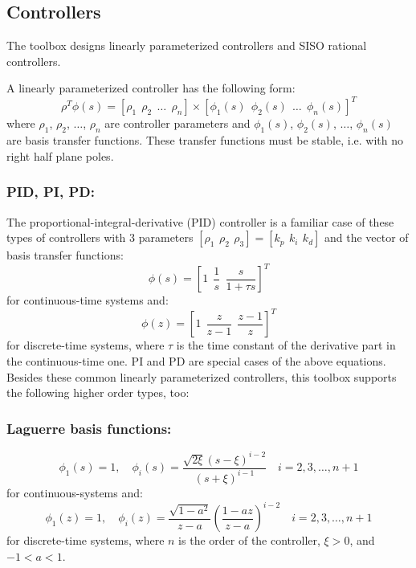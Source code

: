 \documentclass [12pt , a4paper] {report}
\begin{document}
\subsection{Controllers}

The toolbox designs linearly parameterized controllers and SISO rational controllers.

A linearly parameterized controller has the following form:
\begin{equation}
\label{linparcon}
\rho^T \phi(s)=[\rho_1 \: \: \rho_2 \: \: \ldots \:\: \rho_n]\times [\phi_1(s) \: \: \phi_2(s) \:\: \ldots \:\: \phi_n(s)]^T
\end{equation}
where $\rho_1$, $\rho_2$, $\ldots$, $\rho_n$ are controller parameters and $\phi_1(s)$, $\phi_2(s)$, $\ldots$, $\phi_n(s)$ are basis transfer functions. These transfer functions must be stable, i.e. with no right half plane poles. 

\subsubsection{PID, PI, PD:}

The proportional-integral-derivative (PID) controller is a familiar case of these types of controllers with 3 parameters $[\rho_1 \:\, \rho_2 \:\, \rho_3]=[k_p \:\, k_i \:\, k_d]$ and the vector of basis transfer functions:
\begin{equation}
\phi (s)=[1 \:\: \frac{1}{s} \:\: \frac{s}{1+\tau s}]^T
\end{equation}
for continuous-time systems and:
\begin{equation}
\phi (z)=[1 \:\: \frac{z}{z-1} \:\: \frac{z-1}{z}]^T 
\end{equation}
for discrete-time systems, where $\tau$ is the time constant of the derivative part in the continuous-time one. PI and PD are special cases of the above equations. Besides these common linearly parameterized controllers, this toolbox supports the following higher order types, too: 

\subsubsection{Laguerre basis functions:}

\begin{equation}
\phi_1(s)=1, \quad \phi_i(s)=\frac{\sqrt{2\xi}(s-\xi)^{i-2}}{(s+\xi)^{i-1}} \quad   i=2,3,\ldots,n+1 
\end{equation}
for continuous-systems and:
\begin{equation}
\phi_1(z)=1, \quad \phi_i(z)=\frac{\sqrt{1-a^2}}{z-a} \left(\frac{1-az}{z-a}\right)^{i-2} \quad   i=2,3,\ldots,n+1 
\end{equation}
for discrete-time systems, where $n$ is the order of the controller, $\xi>0$, and $-1<a<1$.
\end{document}
